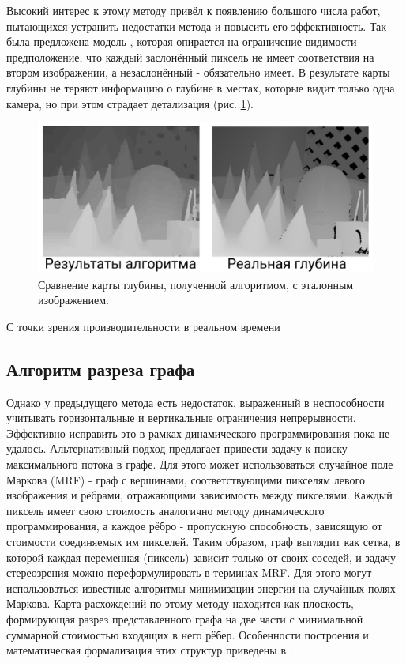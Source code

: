 Высокий интерес к этому методу привёл к появлению большого числа работ, пытающихся устранить недостатки метода и повысить его эффективность. Так была предложена модель \cite{symmetric}, которая 
опирается на ограничение видимости - предположение, что каждый заслонённый пиксель не имеет соответствия на втором изображении, а незаслонённый - обязательно имеет. В результате карты глубины не теряют информацию о глубине 
в местах, которые видит только одна камера, но при этом страдает детализация (рис. \ref{pic:symmetry}). 
\begin{figure}[H]
	\begin{center}
		\includegraphics[scale=0.3]{pics/symmetric_rus.png}
		\caption{ Сравнение карты глубины, полученной алгоритмом, с эталонным изображением. } 
		\label{pic:symmetry} %
	\end{center}
\end{figure}

С точки зрения производительности в реальном времени 

\subsection{Алгоритм разреза графа}
Однако у предыдущего метода есть недостаток, выраженный в неспособности учитывать горизонтальные и вертикальные ограничения непрерывности. Эффективно исправить это в рамках динамического 
программирования пока не удалось. Альтернативный подход предлагает привести задачу к поиску максимального потока в графе. Для этого может использоваться случайное поле Маркова (MRF) - граф с вершинами, 
соответствующими пикселям левого изображения и рёбрами, отражающими зависимость между пикселями. Каждый пиксель имеет свою стоимость аналогично методу динамического программирования, а каждое рёбро - пропускную способность, 
зависящую от стоимости соединяемых им пикселей. Таким образом, граф выглядит как сетка, в которой каждая переменная (пиксель) зависит только от своих соседей, и задачу стереозрения можно переформулировать в терминах MRF.  
Для этого могут использоваться известные алгоритмы минимизации энергии на случайных полях Маркова. Карта расхождений по этому методу находится как плоскость, формирующая разрез представленного графа на две части с минимальной 
суммарной стоимостью входящих в него рёбер. Особенности построения и математическая формализация этих структур приведены в \cite{graphcut,gc_ocl}. 

